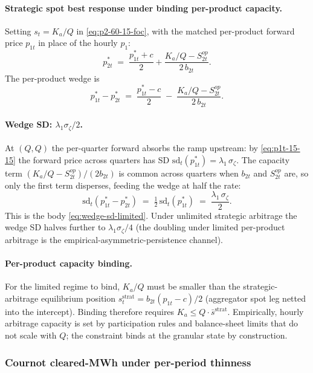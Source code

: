\documentclass[11pt,a4paper]{article}
\theoremstyle{definition}
\theoremstyle{remark}
\theoremstyle{plain}
\begin{document}
\paragraph{Strategic spot best response under binding per-product capacity.} Setting $s_t = K_a/Q$ in \eqref{eq:p2-60-15-foc}, with the matched per-product forward price $p_{1t}$ in place of the hourly $p_1$:
\[
p_{2t}^* \;=\; \frac{p_{1t}^* + c}{2} + \frac{K_a/Q - S^{op}_{2t}}{2\, b_{2t}}.
\]
The per-product wedge is
\[
p_{1t}^* - p_{2t}^* \;=\; \frac{p_{1t}^* - c}{2} \;-\; \frac{K_a/Q - S^{op}_{2t}}{2\, b_{2t}}.
\]

\paragraph{Wedge SD: $\lambda_1\sigma_\zeta/2$.} At $(Q,Q)$ the per-quarter forward absorbs the ramp upstream: by \eqref{eq:p1t-15-15} the forward price across quarters has SD $\mathrm{sd}_t(p_{1t}^*) = \lambda_1\,\sigma_\zeta$. The capacity term $(K_a/Q - S^{op}_{2t})/(2 b_{2t})$ is common across quarters when $b_{2t}$ and $S^{op}_{2t}$ are, so only the first term disperses, feeding the wedge at half the rate:
\[
\boxed{\;\mathrm{sd}_t(p_{1t}^* - p_{2t}^*) \;=\; \tfrac{1}{2}\,\mathrm{sd}_t(p_{1t}^*) \;=\; \frac{\lambda_1\, \sigma_\zeta}{2}.\;}
\]
This is the body \eqref{eq:wedge-sd-limited}. Under unlimited strategic arbitrage the wedge SD halves further to $\lambda_1\sigma_\zeta/4$ (the doubling under limited per-product arbitrage is the empirical-asymmetric-persistence channel).

\paragraph{Per-product capacity binding.} For the limited regime to bind, $K_a/Q$ must be smaller than the strategic-arbitrage equilibrium position $s_t^{\text{strat}} = b_{2t}(p_{1t}-c)/2$ (aggregator spot leg netted into the intercept). Binding therefore requires $K_a \le Q\cdot \bar s^{\text{strat}}$. Empirically, hourly arbitrage capacity is set by participation rules and balance-sheet limits that do not scale with $Q$; the constraint binds at the granular state by construction.

\subsubsection{Cournot cleared-MWh under per-period thinness}
\end{document}
